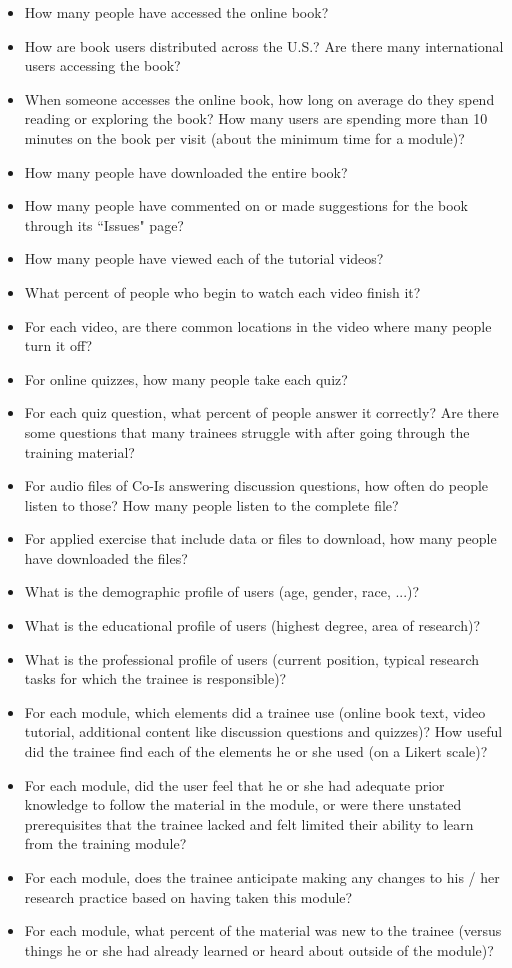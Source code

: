 \documentclass[pdftex,english,11pt,parskip=half]{scrartcl}
\begin{document}
\begin{itemize}
\item How many people have accessed the online book?
\item How are book users distributed across the U.S.? Are there many international users accessing the book?
\item When someone accesses the online book, how long on average do they spend reading or exploring the book? How many users are spending more than 10 minutes on the book per visit (about the minimum time for a module)?
\item How many people have downloaded the entire book?
\item How many people have commented on or made suggestions for the book through its ``Issues" page?
\item How many people have viewed each of the tutorial videos?
\item What percent of people who begin to watch each video finish it? 
\item For each video, are there common locations in the video where many people turn it off?
\item For online quizzes, how many people take each quiz?
\item For each quiz question, what percent of people answer it correctly? Are there some questions that many trainees struggle with after going through the training material?
\item For audio files of Co-Is answering discussion questions, how often do people listen to those? How many people listen to the complete file?
\item For applied exercise that include data or files to download, how many people have downloaded the files?
\item What is the demographic profile of users (age, gender, race, ...)?
\item What is the educational profile of users (highest degree, area of research)?
\item What is the professional profile of users (current position, typical research tasks for which the trainee is responsible)?
\item For each module, which elements did a trainee use (online book text, video tutorial, additional content like discussion questions and quizzes)? How useful did the trainee find each of the elements he or she used (on a Likert scale)?
\item For each module, did the user feel that he or she had adequate prior knowledge to follow the material in the module, or were there unstated prerequisites that the trainee lacked and felt limited their ability to learn from the training module?
\item For each module, does the trainee anticipate making any changes to his / her research practice based on having taken this module?
\item For each module, what percent of the material was new to the trainee (versus things he or she had already learned or heard about outside of the module)?
\end{itemize}
\end{document}
